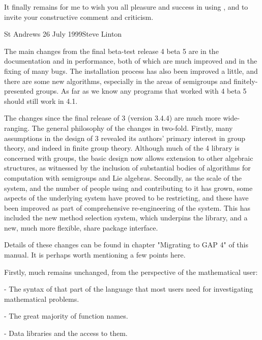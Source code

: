 It finally remains  for me to wish you  all pleasure and success in using
{\GAP}, and to invite your constructive comment and criticism.

St Andrews 26 July 1999\hfill Steve Linton



The main changes from the final beta-test release {\GAP}  4 beta 5 are in
the documentation and in performance, both of which are much improved and
in the   fixing of many  bugs. The  installation  process  has  also been
improved a  little, and there are  some new algorithms, especially in the
areas of semigroups and finitely-presented groups.  As far as we know any
programs that worked with 4 beta 5 should still work in {\GAP} 4.1.

The changes since the final release of  {\GAP} 3 (version 3.4.4) are much
more wide-ranging.   The general philosophy  of  the changes in two-fold.
Firstly, many assumptions in the design of {\GAP} 3 revealed its authors'
primary  interest    in  group  theory,  and  indeed     in  finite group
theory. Although much of the  {\GAP} 4 library  is concerned with groups,
the basic  design now allows extension  to other algebraic structures, as
witnessed  by   the inclusion of   substantial  bodies of  algorithms for
computation with semigroups and Lie  algebras.  Secondly, as the scale of
the  system, and the  number of people  using and contributing  to it has
grown, some   aspects of  the   underlying   system have  proved   to  be
restricting,  and   these have  been  improved as  part  of comprehensive
re-engineering of the system. This has  included the new method selection
system, which underpins the library, and a new, much more flexible, share
package interface.

Details of these changes can be found in chapter "Migrating to GAP 4" of
this manual. It is perhaps worth mentioning a few points here. 

Firstly, much remains unchanged, from the perspective of the mathematical 
user:

\beginlist
  \item{-}
    The syntax of that part  of the {\GAP} language  that most users need
    for investigating mathematical problems.

  \item{-}
    The great majority of function names.

  \item{-}
    Data libraries and the access to them.
\enditems

